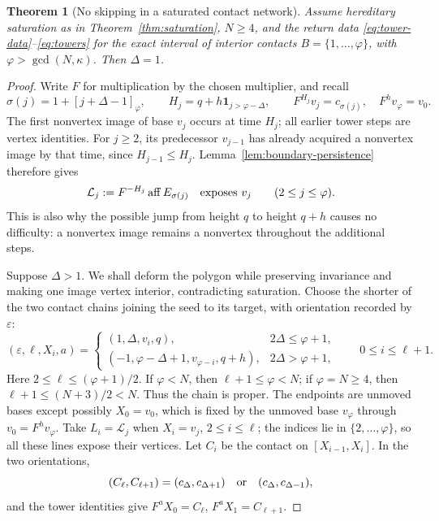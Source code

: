 \documentclass[11pt,a4paper]{article}
\DeclareMathOperator{\aff}{aff}
\newtheorem{theorem}{Theorem}[section]
\theoremstyle{definition}
\theoremstyle{remark}
\numberwithin{equation}{section}
\begin{document}
\begin{theorem}[No skipping in a saturated contact network]
\label{thm:no-skipping}
Assume hereditary saturation as in Theorem~\ref{thm:saturation},
$N\ge4$, and the return data \eqref{eq:tower-data}--\eqref{eq:towers}
for the exact interval of interior contacts
$B=\{1,\ldots,\varphi\}$, with $\varphi>\gcd(N,\kappa)$.
Then $\Delta=1$.
\end{theorem}
\begin{proof}
Write $F$ for multiplication by the chosen multiplier, and recall
\[
 \sigma(j)=1+[j+\Delta-1]_\varphi,\qquad
 H_j=q+h\mathbf1_{j>\varphi-\Delta},\qquad
 F^{H_j}v_j=c_{\sigma(j)},\quad F^hv_\varphi=v_0.
\]
The first nonvertex image of base $v_j$ occurs at time $H_j$; all
earlier tower steps are vertex identities.  For $j\ge2$, its predecessor
$v_{j-1}$ has already acquired a nonvertex image by that time, since
$H_{j-1}\le H_j$.  Lemma~\ref{lem:boundary-persistence} therefore gives
\[
 \mathcal L_j:=F^{-H_j}\aff E_{\sigma(j)}
 \quad\hbox{exposes }v_j\qquad(2\le j\le\varphi).
\]
This is also why the possible jump from height $q$ to height $q+h$
causes no difficulty: a nonvertex image remains a nonvertex throughout
the additional steps.

Suppose $\Delta>1$.  We shall deform the polygon while preserving
invariance and making one image vertex interior, contradicting saturation.
Choose the shorter of the two contact chains joining the seed to its
target, with orientation recorded by $\varepsilon$:
\[
 (\varepsilon,\ell,X_i,a)=
 \begin{cases}
 (1,\Delta,v_i,q),&2\Delta\le\varphi+1,\\
 (-1,\varphi-\Delta+1,v_{\varphi-i},q+h),&2\Delta>\varphi+1,
 \end{cases}
 \qquad 0\le i\le \ell+1.
\]
Here $2\le \ell\le(\varphi+1)/2$.  If $\varphi<N$, then $\ell+1\le\varphi<N$;
if $\varphi=N\ge4$, then $\ell+1\le(N+3)/2<N$.  Thus the chain is proper.
The endpoints are unmoved bases except possibly $X_0=v_0$, which is
fixed by the unmoved base $v_\varphi$ through $v_0=F^hv_\varphi$.
Take $L_i=\mathcal L_j$ when $X_i=v_j$, $2\le i\le \ell$; the indices lie
in $\{2,\ldots,\varphi\}$, so all these lines expose their vertices.
Let $C_i$ be the contact on $[X_{i-1},X_i]$.  In the two orientations,
\[
 (C_\ell,C_{\ell+1})=(c_\Delta,c_{\Delta+1})
 \quad\hbox{or}\quad(c_\Delta,c_{\Delta-1}),
\]
and the tower identities give $F^aX_0=C_\ell$, $F^aX_1=C_{\ell+1}$.


\end{proof}
\end{document}
